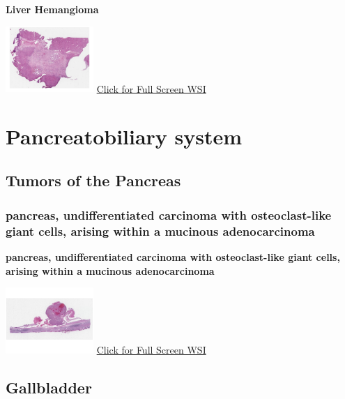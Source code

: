 \documentclass[
  letterpaper,
  paper=6in:9in,
  pagesize=pdftex,
  headinclude=on,
  footinclude=on,
  12pt]{scrbook}
\begin{document}
\textbf{Liver Hemangioma}

\href{https://images.patolojiatlasi.com/liver-hemangioma/HE.html}{\includegraphics[width=0.25\textwidth,height=\textheight]{./screenshots/liver-hemangioma_screenshot.png}}
\href{https://images.patolojiatlasi.com/liver-hemangioma/HE.html}{Click
for Full Screen WSI}

\part{Pancreatobiliary system}

\hypertarget{sec-tumors-of-pancreas}{%
\chapter{Tumors of the Pancreas}\label{sec-tumors-of-pancreas}}

\hypertarget{sec-pancreas-musinous-adenocarcinoma-osteoclastic}{%
\section{pancreas, undifferentiated carcinoma with osteoclast-like giant
cells, arising within a mucinous
adenocarcinoma}\label{sec-pancreas-musinous-adenocarcinoma-osteoclastic}}

\textbf{pancreas, undifferentiated carcinoma with osteoclast-like giant
cells, arising within a mucinous adenocarcinoma}

\href{https://images.patolojiatlasi.com/pancreas-undifferentiated-osteoclast/HE.html}{\includegraphics[width=0.25\textwidth,height=\textheight]{./screenshots/pancreas-undifferentiated-osteoclast_screenshot.png}}
\href{https://images.patolojiatlasi.com/pancreas-undifferentiated-osteoclast/HE.html}{Click
for Full Screen WSI}

\hypertarget{sec-gallbladder}{%
\chapter{Gallbladder}\label{sec-gallbladder}}
\end{document}

